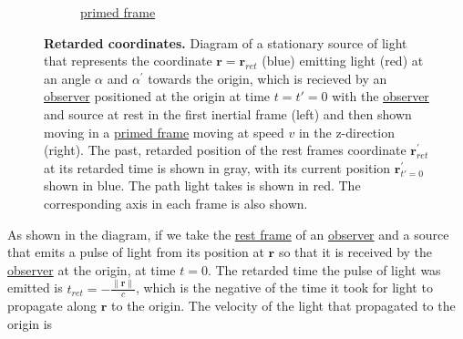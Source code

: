 \begin{figure}[ht]
\begin{subfigure}[b]{.49\textwidth}
		\caption{\hyperlink{def-Primed-Frame}{primed frame}}
	\end{subfigure}
	\caption{\textbf{Retarded coordinates.} Diagram of a stationary source of light that represents the coordinate ${\mathbf{r}} = {\mathbf{r}_{ret}}$ (blue) emitting light (red) at an angle ${\alpha}$ and ${\alpha^{'}}$ towards the origin, which is recieved by an \protect\hyperlink{def-observer}{observer} positioned at the origin at time ${t} = {t{'}} = 0$ with the \protect\hyperlink{def-observer}{observer} and source at rest in the first inertial frame (left) and then shown moving in a \protect\hyperlink{def-Primed-Frame}{primed frame} moving at speed ${v}$ in the z-direction (right). The past, retarded position of the rest frames coordinate ${\mathbf{r}_{ret}^{'}}$ at its retarded time is shown in gray, with its current position ${\mathbf{r}_{{t{'}} = 0}^{'}}$ shown in blue. The path light takes is shown in red. The corresponding axis in each frame is also shown.}
	\label{fig: Retarded field}
\end{figure}

As shown in the diagram, if we take the \hyperlink{def-proper-frame}{rest frame} of an \hyperlink{def-observer}{observer} and a source that emits a pulse of light from its position at ${\mathbf{r}}$ so that it is received by the \hyperlink{def-observer}{observer} at the origin, at time ${t} = 0$.
The retarded time the pulse of light was emitted is ${{t}_{ret}} =-\frac{\|\mathbf{r}\|}{c}$, which is the negative of the time it took for light to propagate along ${\mathbf{r}}$ to the origin.
The velocity of the light that propagated to the origin is

